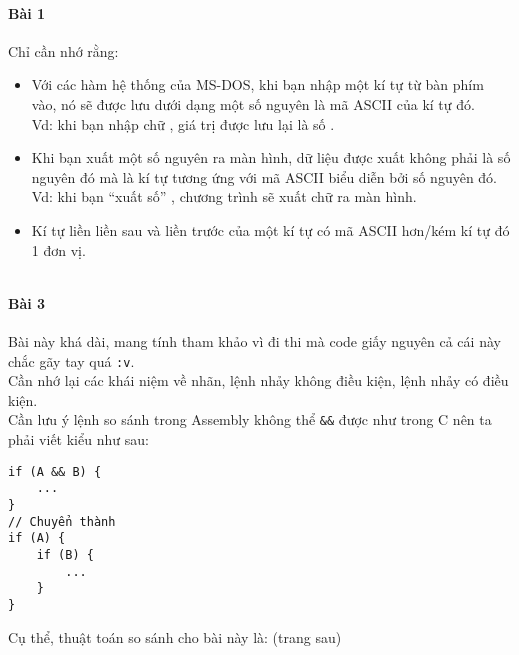 \documentclass[main.tex]{subfiles}
\begin{document}
\paragraph*{Bài 1}
Chỉ cần nhớ rằng:
\begin{itemize}
    \item Với các hàm hệ thống của MS-DOS, khi bạn nhập một kí tự từ bàn phím vào, nó sẽ được lưu dưới dạng một số nguyên là mã ASCII của kí tự đó.\\
        Vd: khi bạn nhập chữ , giá trị được lưu lại là số .
    \item Khi bạn xuất một số nguyên ra màn hình, dữ liệu được xuất không phải là số nguyên đó mà là kí tự tương ứng với mã ASCII biểu diễn bởi số nguyên đó.\\
        Vd: khi bạn ``xuất số'' , chương trình sẽ xuất chữ  ra màn hình.
    \item Kí tự liền liền sau và liền trước của một kí tự có mã ASCII hơn/kém kí tự đó 1 đơn vị.
\end{itemize}

\inputminted[linenos,breaklines]{nasm}{answer_source/Bai1.asm}
\paragraph*{Bài 3}
Bài này khá dài, mang tính tham khảo vì đi thi mà code giấy nguyên cả cái này chắc gãy tay quá \verb#:v#.\\
Cần nhớ lại các khái niệm về nhãn, lệnh nhảy không điều kiện, lệnh nhảy có điều kiện.\\
Cần lưu ý lệnh so sánh trong Assembly không thể \verb#&&# được như  trong C nên ta phải viết kiểu như sau:
\begin{verbatim}
if (A && B) {
    ...
}
// Chuyển thành
if (A) {
    if (B) {
        ...
    }
}
\end{verbatim}
Cụ thể, thuật toán so sánh cho bài này là: (trang sau)
\end{document}
